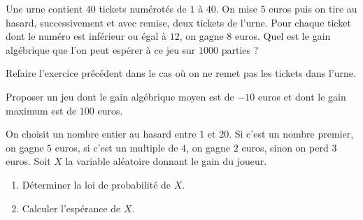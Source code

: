 \documentclass[11pt]{article}
\begin{document}
\newpage
\thispagestyle{empty}
\setcounter{exo}{0}

\begin{exo}
  Une urne contient $40$ tickets numérotés de $1$ à $40$. On mise $5$ euros puis
  on tire au hasard, successivement et avec remise, deux tickets de l'urne. Pour
  chaque ticket dont le numéro est inférieur ou égal à $12$, on gagne $8$ euros.
  Quel est le gain algébrique que l'on peut espérer à ce jeu sur $1000$ parties
  ?
\end{exo}

\begin{exo}
  Refaire l'exercice précédent dans le cas où on ne remet pas les tickets dans
  l'urne.
\end{exo}

\begin{exo}
  Proposer un jeu dont le gain algébrique moyen est de $-10$ euros et dont le
  gain maximum est de $100$ euros.
\end{exo}

\begin{exo}
  On choisit un nombre entier au hasard entre $1$ et $20$. Si c'est un nombre
  premier, on gagne $5$ euros, si c'est un multiple de $4$, on gagne $2$ euros,
  sinon on perd $3$ euros. Soit $X$ la variable aléatoire donnant le gain du
  joueur.
  \begin{enumerate}
    \item Déterminer la loi de probabilité de $X$.
    \item Calculer l'espérance de $X$.
  \end{enumerate}
\end{exo}
\end{document}
